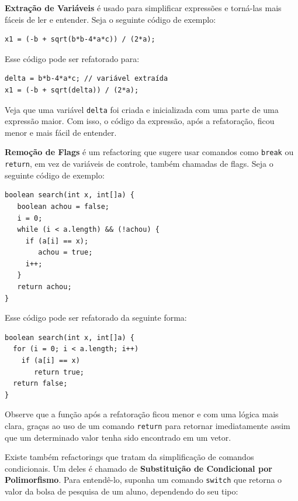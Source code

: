 \documentclass[
  11pt,
  twoside]{book}
\newcommand{\passthrough}[1]{#1}
\begin{document}
 \textbf{Extração de Variáveis}
é usado para simplificar expressões e torná-las mais fáceis de ler e
entender. Seja o seguinte código de exemplo:

\begin{lstlisting}
x1 = (-b + sqrt(b*b-4*a*c)) / (2*a);
\end{lstlisting}

Esse código pode ser refatorado para:

\begin{lstlisting}
delta = b*b-4*a*c; // variável extraída
x1 = (-b + sqrt(delta)) / (2*a);
\end{lstlisting}

Veja que uma variável \passthrough{\lstinline!delta!} foi criada e
inicializada com uma parte de uma expressão maior. Com isso, o código da
expressão, após a refatoração, ficou menor e mais fácil de entender.

 \textbf{Remoção de Flags} é um
refactoring que sugere usar comandos como
\passthrough{\lstinline!break!} ou \passthrough{\lstinline!return!}, em
vez de variáveis de controle, também chamadas de flags. Seja o seguinte
código de exemplo:

\begin{lstlisting}
boolean search(int x, int[]a) {
   boolean achou = false;
   i = 0;
   while (i < a.length) && (!achou) {
     if (a[i] == x);
        achou = true;
     i++;
   }
   return achou;
}
\end{lstlisting}

Esse código pode ser refatorado da seguinte forma:

\begin{lstlisting}
boolean search(int x, int[]a) {
  for (i = 0; i < a.length; i++)
    if (a[i] == x)
       return true;
  return false;
}
\end{lstlisting}

Observe que a função após a refatoração ficou menor e com uma lógica
mais clara, graças ao uso de um comando \passthrough{\lstinline!return!}
para retornar imediatamente assim que um determinado valor tenha sido
encontrado em um vetor.

 Existe
também refactorings que tratam da simplificação de comandos
condicionais. Um deles é chamado de \textbf{Substituição de Condicional
por Polimorfismo}. Para entendê-lo, suponha um comando
\passthrough{\lstinline!switch!} que retorna o valor da bolsa de
pesquisa de um aluno, dependendo do seu tipo:
\end{document}
